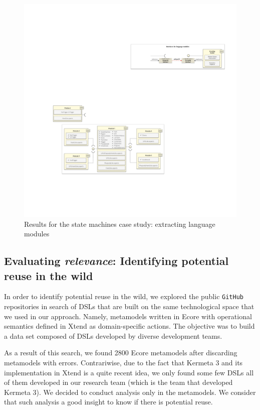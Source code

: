 \begin{figure}
\centering
\includegraphics[width=1\linewidth]{images/puzzle-modularization.pdf}
\caption{Results for the state machines case study: extracting language modules}
\label{fig:puzzle-modularization}
\end{figure}

\subsection{Evaluating \textit{relevance}: Identifying potential reuse in the wild}

In order to identify potential reuse in the wild, we explored the public \texttt{GitHub} repositories in search of DSLs that are built on the same technological space that we used in our approach. Namely, metamodels written in Ecore with operational semantics defined in Xtend as domain-specific actions. The objective was to build a data set composed of DSLs developed by diverse development teams. 

As a result of this search, we found 2800 Ecore metamodels after discarding metamodels with errors. Contrariwise, due to the fact that Kermeta 3 and its implementation in Xtend is a quite recent idea, we only found some few DSLs all of them developed in our research team (which is the team that developed Kermeta 3). We decided to conduct analysis only in the metamodels. We consider that such analysis a good insight to know if there is potential reuse.

